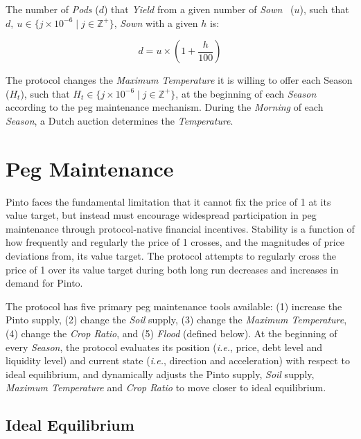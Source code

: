 \documentclass[tikz]{article}
\newcommand{\term}[1]{\textsl{#1}}
\newcommand{\Pinto}{} %
\begin{document}
The number of \term{Pods} ($d$) that \term{Yield} from a given number of \term{Sown} \Pinto\ ($u$), such that $d,\ u \in \{j \times 10^{-6} \mid j \in \mathbb{Z}^{+} \}$, \term{Sown} with a given $h$ is:

    $$
        d = u \times \left(1 + \frac{h}
                                {100}
                    \right)
    $$

The protocol changes the \term{Maximum Temperature} it is willing to offer each Season ($H_{t}$), such that $H_{t} \in \{j \times 10^{-6} \mid j \in \mathbb{Z}^{+} \}$, at the beginning of each \term{Season} according to the peg maintenance mechanism. During the \term{Morning} of each \term{Season}, a Dutch auction determines the \term{Temperature}.


\section{Peg Maintenance}

Pinto faces the fundamental limitation that it cannot fix the price of \Pinto1 at its value target, but instead must encourage widespread participation in peg maintenance through protocol-native financial incentives. Stability is a function of how frequently and regularly the price of \Pinto1 crosses, and the magnitudes of price deviations from, its value target. The protocol attempts to regularly cross the price of \Pinto1 over its value target during both long run decreases and increases in demand for Pinto.

The protocol has five primary peg maintenance tools available: (1) increase the Pinto supply, (2) change the \term{Soil} supply, (3) change the \term{Maximum Temperature}, (4) change the \term{Crop Ratio}, and (5) \term{Flood} (defined below). At the beginning of every \term{Season}, the protocol evaluates its position (\textit{i.e.}, price, debt level and liquidity level) and current state (\textit{i.e.}, direction and acceleration) with respect to ideal equilibrium, and dynamically adjusts the Pinto supply, \term{Soil} supply, \term{Maximum Temperature} and \term{Crop Ratio} to move closer to ideal equilibrium.


\subsection{Ideal Equilibrium}
\end{document}
